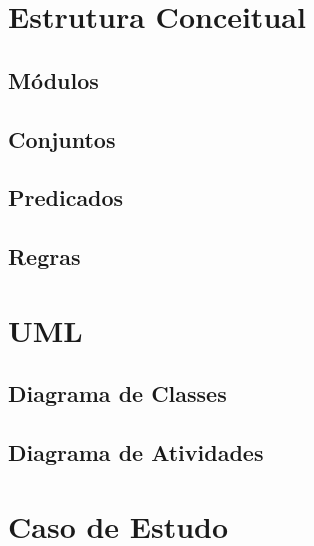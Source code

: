 \documentclass[openright]{normas-utf-tex} %
\begin{document}
	
	
	\section{Estrutura Conceitual}

	

		\subsection{Módulos}

			
		
		\subsection{Conjuntos}

			

		\subsection{Predicados}

			

		\subsection{Regras}

			

	\section{UML}
		\subsection{Diagrama de Classes}

			

		\subsection{Diagrama de Atividades}

			

	\section{Caso de Estudo}
\end{document}
